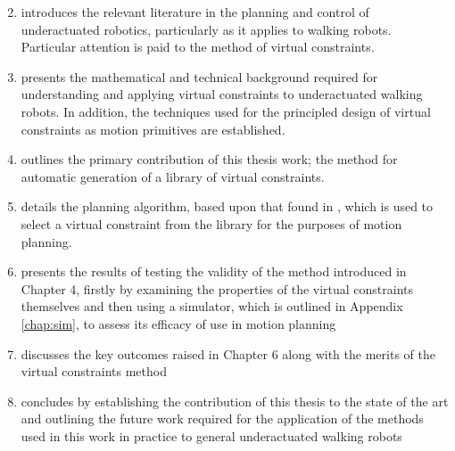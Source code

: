 \begin{adjustwidth}{1.4cm}{}
\begin{enumerate}[label=\bfseries Chapter \arabic*]
	\setcounter{enumi}{1}
	\item introduces the relevant literature in the planning and control of underactuated robotics, particularly as it applies to walking robots. Particular attention is paid to the method of virtual constraints.
	\item presents the mathematical and technical background required for understanding and applying virtual constraints to underactuated walking robots. In addition, the techniques used for the principled design of virtual constraints as motion primitives are established.
	\item outlines the primary contribution of this thesis work; the method for automatic generation of a library of virtual constraints.
	\item details the planning algorithm, based upon that found in \cite{manchester13planning}, which is used to select a virtual constraint from the library for the purposes of motion planning.
	\item presents the results of testing the validity of the method introduced in Chapter 4, firstly by examining the properties of the virtual constraints themselves and then using a simulator, which is outlined in Appendix \ref{chap:sim}, to assess its efficacy of use in motion planning
	\item discusses the key outcomes raised in Chapter 6 along with the merits of the virtual constraints method
	\item concludes by establishing the contribution of this thesis to the state of the art and outlining the future work required for the application of the methods used in this work in practice to general underactuated walking robots
\end{enumerate}
\end{adjustwidth}